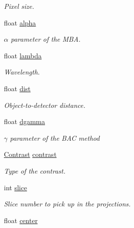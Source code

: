 \begin{DoxyCompactItemize}
\begin{DoxyCompactList}\small\item\em Pixel size. \item\end{DoxyCompactList}\item 
float \hyperlink{structclargs_a5e1a598ac662ec40790638ef40947e61}{alpha}
\begin{DoxyCompactList}\small\item\em $\alpha$ parameter of the MBA. \item\end{DoxyCompactList}\item 
float \hyperlink{structclargs_a65b54d07666689a60f098e56ef3d69f1}{lambda}
\begin{DoxyCompactList}\small\item\em Wavelength. \item\end{DoxyCompactList}\item 
float \hyperlink{structclargs_a5e6a124c43d697e128d0fb7b3bfc3522}{dist}
\begin{DoxyCompactList}\small\item\em Object-\/to-\/detector distance. \item\end{DoxyCompactList}\item 
float \hyperlink{structclargs_aba257053a55cf9397cb83135e37030cb}{dgamma}
\begin{DoxyCompactList}\small\item\em $\gamma$ parameter of the BAC method \item\end{DoxyCompactList}\item 
\hyperlink{classContrast}{Contrast} \hyperlink{structclargs_a935d211849fe10f5717d628608bbd4e3}{contrast}
\begin{DoxyCompactList}\small\item\em Type of the contrast. \item\end{DoxyCompactList}\item 
int \hyperlink{structclargs_a0cff1a299f1fb048671785956704fad9}{slice}
\begin{DoxyCompactList}\small\item\em Slice number to pick up in the projections. \item\end{DoxyCompactList}\item 
float \hyperlink{structclargs_a754006a265d07d01ba9333ad6f0624d5}{center}

\end{DoxyCompactItemize}
